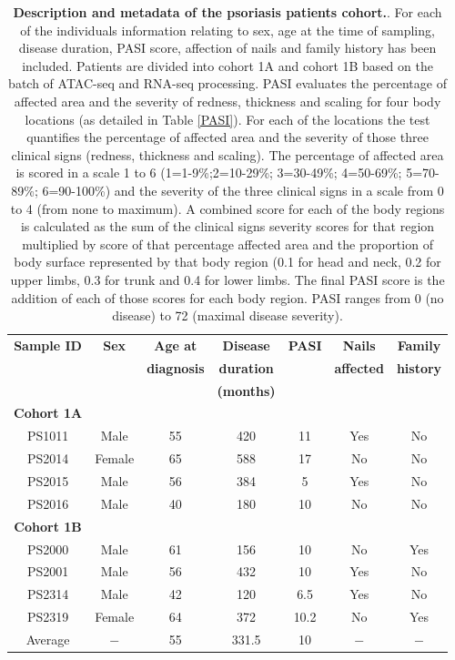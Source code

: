 		
\begin{table}[htbp]
\centering
\begin{tabular}{@{} c c c c c c c}
\toprule
\textbf{ Sample ID} & \textbf{Sex} & \textbf{Age at}    & \textbf{Disease}  & \textbf{PASI}  &\textbf{Nails}      & \textbf{Family} \\
                    &              & \textbf{diagnosis} & \textbf{duration} &                & \textbf{affected}  & \textbf{history} \\
										&							 &										&	\textbf{(months)}	&								 &                    &                  \\
\midrule
\midrule
\textbf{Cohort 1A} & & & & & & \\
\midrule
PS1011	& Male	 & 55 & 420 & 11	 & Yes	 & No \\
PS2014	& Female & 65	& 588	& 17	 & No	   & No \\
PS2015	& Male	 & 56	& 384	& 5	   & Yes   & No \\
PS2016	& Male	 & 40	& 180	& 10	 & No    & No \\
\midrule
\midrule
\textbf{Cohort 1B} & & & & & & \\
\midrule
PS2000	& Male	 & 61	& 156	& 10	 & No	   & Yes \\
PS2001	& Male	 & 56	& 432	& 10	 & Yes	 & No \\
PS2314	& Male	 & 42	& 120	& 6.5	 & Yes   & No \\
PS2319	& Female & 64	& 372	& 10.2 & No    & Yes \\
\midrule
Average		& $-$	 & 55 & 331.5 & 10 & $-$   & $-$ \\																			
\bottomrule
\end{tabular}
\medskip %
\caption[Description and metadata of the psoriasis patients cohort.]{\textbf{Description and metadata of the psoriasis patients cohort.}. For each of the individuals information relating to sex, age at the time of sampling, disease duration, PASI score, affection of nails and family history has been included. Patients are divided into cohort 1A and cohort 1B based on the batch of ATAC-seq and RNA-seq processing. PASI  evaluates the percentage of affected area and the severity of redness, thickness and scaling for four body locations (as detailed in Table \ref{PASI}). For each of the locations the test quantifies the percentage of affected area and the severity of those three clinical signs (redness, thickness and scaling). The percentage of affected area is scored in a scale 1 to 6 (1=1-9\%;2=10-29\%; 3=30-49\%; 4=50-69\%; 5=70-89\%; 6=90-100\%) and the severity of the three clinical signs in a scale from 0 to 4 (from none to maximum). A combined score for each of the body regions is calculated as the sum of the clinical signs severity scores for that region multiplied by score of that percentage affected area and the proportion of body surface represented by that body region (0.1 for head and neck, 0.2 for upper limbs, 0.3 for trunk and 0.4 for lower limbs. The final PASI score is the addition of each of those scores for each body region. PASI ranges from 0 (no disease) to 72 (maximal disease severity).} 
\label{tab:Psoriasis_cohort_metadata}
\end{table}
